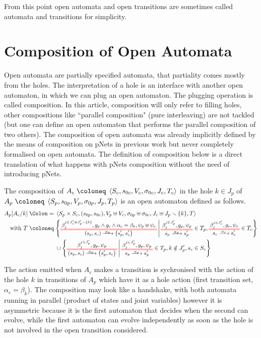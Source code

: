 \documentclass{article}
\begin{document}
From this point open automata and open transitions are sometimes called automata and transitions for simplicity. %


\section{Composition of Open Automata}\label{sec:comp}
Open automata are partially specified automata, that partiality comes mostly from the holes.
The interpretation of a hole is an interface with another open automaton, in which we can plug an open automaton. The plugging operation is called composition.
In this article, composition will only refer to filling holes, other compositions like ``parallel composition" (pure interleaving) are not tackled (but one can define an open automaton that performs the parallel composition of two others).
The composition of open automata was already implicitly defined by the means of composition on pNets in previous work \cite{henrio:01299562} but never completely formalised on open automata.
The definition of composition below is a direct translation of what happens with pNets composition without the need of introducing pNets.
\begin{defi}
The composition of \(A_c \defobject \OAg[c]\) in the hole \(k \in J_p\) of \(A_p \defobject \OAg[p]\) is an open automaton defined as follows.
\begin{align*}
	A_p\subst{A_c}{k} \defnotation & \OA{S_p \times S_c}{\mpar{s_{0p}, s_{0c}}}{V_p \uplus V_c}{\sigma_{0p} \uplus \sigma_{0c}}{J_c \uplus J_p \setminus \mbrc{k}}{T} \\
	\text{with } T \defobject & \mset{\OT{\mpar{s_p, s_c}}{\mpar{s'_p, s'_c}}{\alpha_p}{\beta_j^{j \in J'_c \uplus J'_p \setminus \mbrc{k}}}{g_p \wedge g_c \wedge \alpha_c = \beta_k}{\psi_p \uplus \psi_c}}{\OTx{p}{}{}{p} \in T_p, \OTx{c}{}{}{c} \in T_c} \\
	& \cup \mset{\OT{\mpar{s_p, s_c}}{\mpar{s'_p, s_c}}{\alpha_p}{\beta_j^{j \in J'_p}}{g_p}{\psi_p}}{\OTx{p}{}{}{p} \in T_p, k \notin J'_p, s_c \in S_c}
\end{align*}
\end{defi}
The action emitted when \(A_c\) makes a transition is sychronised with the action of the hole \(k\) in transitions of \(A_p\) which have it as a hole action (first transition set, \(\alpha_c = \beta_k\)).
The composition may look like a handshake, with both automata running in parallel (product of states and joint variables) however it is asymmetric because it is the first automaton that decides when the second can evolve, while the first automaton can evolve independently as soon as the hole is not involved in the open transition considered.
\end{document}
